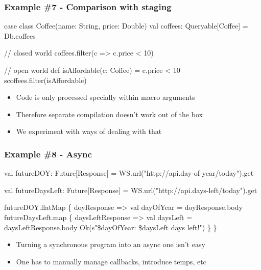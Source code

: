 \documentclass[svgnames,hyperref={bookmarks=false}]{beamer}
\begin{document}
\begin{frame}[fragile]
\frametitle{Example \#7 - Comparison with staging}

\begin{semiverbatim}
case class Coffee(name: String, price: Double)
val coffees: Queryable[Coffee] = Db.coffees

// closed world
coffees.\alert{filter(}c => c.price < 10\alert{)}

// open world
def isAffordable(c: Coffee) = c.price < 10
scoffees.\alert{filter(}isAffordable{)}

\end{semiverbatim}

\begin{itemize}
\item Code is only processed specially within macro arguments
\item Therefore separate compilation doesn't work out of the box
\item We experiment with ways of dealing with that
\end{itemize}
\end{frame}

\begin{frame}[fragile, t]
\frametitle{Example \#8 - Async}

\begin{semiverbatim}
val futureDOY: Future[Response] =
  WS.url("http://api.day-of-year/today").get

val futureDaysLeft: Future[Response] =
  WS.url("http://api.days-left/today").get

futureDOY.flatMap \{ doyResponse =>
  val dayOfYear = doyResponse.body
  futureDaysLeft.map \{ daysLeftResponse =>
    val daysLeft = daysLeftResponse.body
    Ok(s"\$dayOfYear: \$daysLeft days left!")
  \}
\}
\end{semiverbatim}

\begin{itemize}
\item Turning a synchronous program into an async one isn't easy
\item One has to manually manage callbacks, introduce temps, etc
\end{itemize}
\end{frame}
\end{document}
